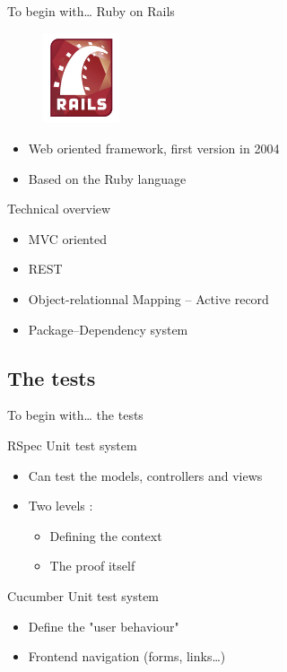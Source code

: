 \documentclass[10pt,a4paper]{beamer}
\begin{document}
\begin{frame}{To begin with… Ruby on Rails}
  \begin{figure}[htp]
  \centering
  \includegraphics[width=0.2\textwidth]{../img/logo_rails.png}
  \end{figure}

  \begin{itemize}
    \item Web oriented framework, first version in 2004
    \item Based on the Ruby language
  \end{itemize}

  \begin{block}{Technical overview}
    \begin{itemize}
      \item MVC oriented
      \item REST
      \item Object-relationnal Mapping -- Active record
      \item Package--Dependency system
    \end{itemize}
  \end{block}
\end{frame}

\subsection{The tests}

\begin{frame}{To begin with… the tests}

  \begin{block}{RSpec}
  	Unit test system
    \begin{itemize}
      \item Can test the models, controllers and views
      \item Two levels : 
		\begin{itemize}
		  \item Defining the context
		  \item The proof itself
		\end{itemize}
    \end{itemize}
  \end{block}
  
  \begin{block}{Cucumber}
  	Unit test system
    \begin{itemize}
      \item Define the "user behaviour"
      \item Frontend navigation (forms, links…)
    \end{itemize}
  \end{block}
\end{frame}
\end{document}
